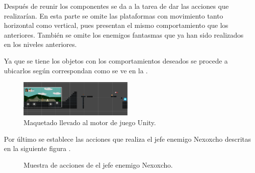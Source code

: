 Después de reunir los componentes se da a la tarea de dar las acciones que realizarían. En esta parte se omite las plataformas con movimiento tanto horizontal como vertical, pues presentan el mismo comportamiento que los anteriores. También se omite los enemigos fantasmas que ya han sido realizados en los niveles anteriores.

Ya que se tiene los objetos con los comportamientos deseados se procede a ubicarlos según correspondan como se ve en la \cite{fig:n504}.
\begin{figure}
	\centering
	\caption{Maquetado llevado al motor de juego Unity.}
	\label{fig:n504}
	\includegraphics[width=0.5\textwidth]{03TrabajoRealizado/DocProduccionR/imagenes/n9/n902.png}
\end{figure}

Por último se establece las acciones que realiza el jefe enemigo Nexoxcho descritas en la siguiente figura \cite{fig:n905}.
\begin{figure}[htbp]
	\centering
	\caption{Muestra de acciones de el jefe enemigo Nexoxcho.} \label{fig:n905}
\end{figure}